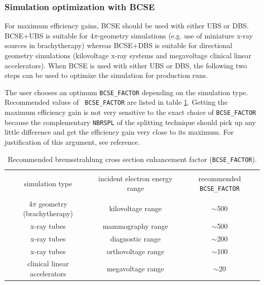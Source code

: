 \documentclass[12pt,twoside]{article}
\begin{document}

\subsubsection{Simulation optimization with BCSE}

For maximum efficiency gains, BCSE should be used with either UBS or
DBS. BCSE+UBS is suitable for 4$\pi$-geometry simulations (e.g. use of
miniature x-ray sources in brachytherapy) whereas BCSE+DBS is suitable
for directional geometry simulations (kilovoltage x-ray systems and
megavoltage clinical linear accelerators). When BCSE is used with
either UBS or DBS, the following two steps can be used to optimize the
simulation for production runs.

 The user chooses an optimum {\tt BCSE\_FACTOR}
depending on the simulation type. Recommended values of {\tt
BCSE\_FACTOR} are listed in table \ref{table_optima}. Getting the
maximum efficiency gain is not very sensitive to the exact choice of
{\tt BCSE\_FACTOR} because the complementary {\tt NBRSPL} of the
splitting technique should pick up any little difference and get the
efficiency gain very close to its maximum. For justification of this
argument, see reference\cite{AR07}.

\vspace{0.3cm}
\begin{table}[h]
\caption{Recommended bremsstrahlung cross section enhancement factor
({\tt BCSE\_FACTOR}). \label{table_optima}}
\vspace{-0.5cm}
\begin{center}
\begin{tabular}{|c|c|c|}
\hline
 & & \\
simulation type & incident electron energy range & recommended {\tt BCSE\_FACTOR} \\
 & & \\ \hline
 4$\pi$ geometry (brachytherapy) & kilovoltage range & $\sim$500 \\
x-ray tubes & mammography range & $\sim$500 \\
x-ray tubes & diagnostic range & $\sim$200 \\
x-ray tubes & orthovoltage range & $\sim$100 \\
clinical linear accelerators & megavoltage range & $\sim$20 \\
\hline
\end{tabular}
\end{center}
\end{table}
\vspace{0.3cm}
\end{document}
